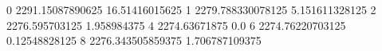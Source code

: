0 2291.15087890625 16.51416015625
1 2279.788330078125 5.151611328125
2 2276.595703125 1.958984375
4 2274.63671875 0.0
6 2274.76220703125 0.12548828125
8 2276.343505859375 1.706787109375
